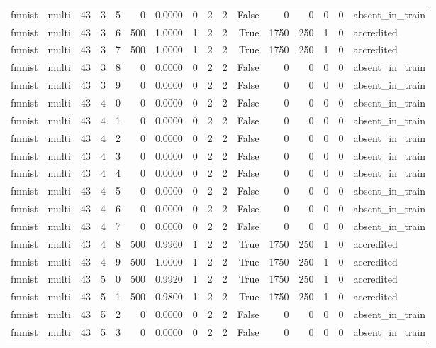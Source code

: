 \begin{tabular}{llrrrrrrrrrrrrrl}
fmnist & multi & 43 & 3 & 5 & 0 & 0.0000 & 0 & 2 & 2 & False & 0 & 0 & 0 & 0 & absent\_in\_train \\
fmnist & multi & 43 & 3 & 6 & 500 & 1.0000 & 1 & 2 & 2 & True & 1750 & 250 & 1 & 0 & accredited \\
fmnist & multi & 43 & 3 & 7 & 500 & 1.0000 & 1 & 2 & 2 & True & 1750 & 250 & 1 & 0 & accredited \\
fmnist & multi & 43 & 3 & 8 & 0 & 0.0000 & 0 & 2 & 2 & False & 0 & 0 & 0 & 0 & absent\_in\_train \\
fmnist & multi & 43 & 3 & 9 & 0 & 0.0000 & 0 & 2 & 2 & False & 0 & 0 & 0 & 0 & absent\_in\_train \\
fmnist & multi & 43 & 4 & 0 & 0 & 0.0000 & 0 & 2 & 2 & False & 0 & 0 & 0 & 0 & absent\_in\_train \\
fmnist & multi & 43 & 4 & 1 & 0 & 0.0000 & 0 & 2 & 2 & False & 0 & 0 & 0 & 0 & absent\_in\_train \\
fmnist & multi & 43 & 4 & 2 & 0 & 0.0000 & 0 & 2 & 2 & False & 0 & 0 & 0 & 0 & absent\_in\_train \\
fmnist & multi & 43 & 4 & 3 & 0 & 0.0000 & 0 & 2 & 2 & False & 0 & 0 & 0 & 0 & absent\_in\_train \\
fmnist & multi & 43 & 4 & 4 & 0 & 0.0000 & 0 & 2 & 2 & False & 0 & 0 & 0 & 0 & absent\_in\_train \\
fmnist & multi & 43 & 4 & 5 & 0 & 0.0000 & 0 & 2 & 2 & False & 0 & 0 & 0 & 0 & absent\_in\_train \\
fmnist & multi & 43 & 4 & 6 & 0 & 0.0000 & 0 & 2 & 2 & False & 0 & 0 & 0 & 0 & absent\_in\_train \\
fmnist & multi & 43 & 4 & 7 & 0 & 0.0000 & 0 & 2 & 2 & False & 0 & 0 & 0 & 0 & absent\_in\_train \\
fmnist & multi & 43 & 4 & 8 & 500 & 0.9960 & 1 & 2 & 2 & True & 1750 & 250 & 1 & 0 & accredited \\
fmnist & multi & 43 & 4 & 9 & 500 & 1.0000 & 1 & 2 & 2 & True & 1750 & 250 & 1 & 0 & accredited \\
fmnist & multi & 43 & 5 & 0 & 500 & 0.9920 & 1 & 2 & 2 & True & 1750 & 250 & 1 & 0 & accredited \\
fmnist & multi & 43 & 5 & 1 & 500 & 0.9800 & 1 & 2 & 2 & True & 1750 & 250 & 1 & 0 & accredited \\
fmnist & multi & 43 & 5 & 2 & 0 & 0.0000 & 0 & 2 & 2 & False & 0 & 0 & 0 & 0 & absent\_in\_train \\
fmnist & multi & 43 & 5 & 3 & 0 & 0.0000 & 0 & 2 & 2 & False & 0 & 0 & 0 & 0 & absent\_in\_train \\

\end{tabular}

